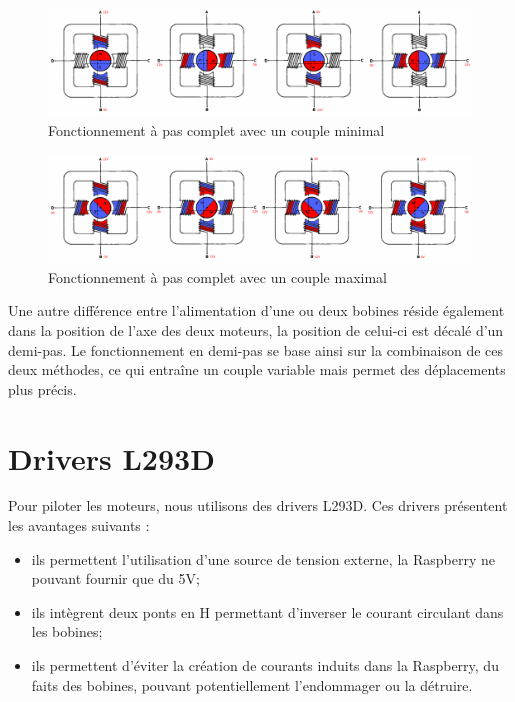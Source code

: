 \documentclass[12pt,a4paper]{report}
\begin{document}
\begin{center}
\begin{figure}[!h]
 \center
 \includegraphics[scale=0.28]{../pictures/motor_min.png}
 \caption{Fonctionnement à pas complet avec un couple minimal\protect\footnotemark}
 \label{Motor_min}
\end{figure}

\begin{figure}[!h]
 \center
 \includegraphics[scale=0.28]{../pictures/motor_max.png}
 \caption{Fonctionnement à pas complet avec un couple maximal\protect\footnotemark}
 \label{Motor_max}
\end{figure}
\end{center}

Une autre différence entre l'alimentation d'une ou deux bobines réside également dans la position de l'axe des deux moteurs, la position de celui-ci est décalé d'un demi-pas. Le fonctionnement en demi-pas se base ainsi sur la combinaison de ces deux méthodes, ce qui entraîne un couple variable mais permet des déplacements plus précis.

\section{Drivers L293D}
Pour piloter les moteurs, nous utilisons des drivers L293D. Ces drivers présentent les avantages suivants :
\begin{itemize}[label=--,itemsep=0pt,font=\bf\Large,labelsep=5mm]
\item ils permettent l'utilisation d'une source de tension externe, la Raspberry ne pouvant fournir que du 5V;
\item ils intègrent deux ponts en H permettant d'inverser le courant circulant dans les bobines;
\item ils permettent d'éviter la création de courants induits dans la Raspberry, du faits des bobines, pouvant potentiellement l'endommager ou la détruire.
\end{itemize}
\end{document}
